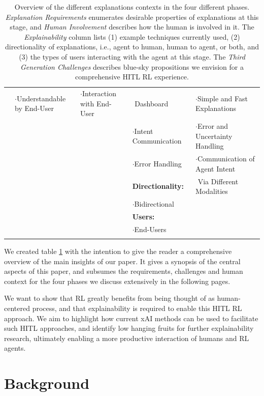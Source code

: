 \documentclass[twoside,11pt]{article}
\begin{document}
\begin{table}[!htbp]
{\begin{tabular}{|c||l|l|l|l|}
			&  $\cdot$Understandable by End-User& $\cdot$Interaction with End-User	&	 $ $ Dashboard	&	$\cdot$Simple and Fast Explanations\\
			&  & 	&	 $\cdot$Intent Communication	& $\cdot$Error and Uncertainty Handling	\\
			&  & 	&	 $\cdot$Error Handling	& $\cdot$Communication of Agent Intent \\
			&  & 	&	\textbf{Directionality:}	&$ $ Via Different Modalities	\\
			&   & 	&	 $\cdot$Bidirectional	&	\\
			&   & 	&\textbf{Users:}	&	\\
			&   & 	&	 $\cdot$End-Users	&	\\
			&  &  & & \\
			\cline{1-5}
		\end{tabular}
	}
	\caption{Overview of the different explanations contexts in the four different phases. \emph{Explanation Requirements} enumerates desirable properties of explanations at this stage, and \emph{Human Involvement} describes how the human is involved in it. The \emph{Explainability} column lists (1) example techniques currently used, (2) directionality of explanations, i.e., agent to human, human to agent, or both, and (3) the types of users interacting with the agent at this stage. The \emph{Third Generation Challenges} describes blue-sky propositions we envision for a comprehensive HITL RL experience.}
	\label{table:Explanations_table}
\end{table}

We created  table \ref{table:Explanations_table} with the intention to give the reader a comprehensive overview of the main insights of our paper. It gives a synopsis of the central aspects of this paper, and subsumes the requirements, challenges and human context for the four phases we discuss extensively in the following pages. 

We want to show that RL greatly benefits from being thought of as human-centered process, and that explainability is required to enable this HITL RL approach. We aim to highlight how current xAI methods can be used to facilitate such HITL approaches, and identify low hanging fruits for further explainability research, ultimately enabling a more productive interaction of humans and RL agents.

\section{Background}
\label{sec:background}
\end{document}
